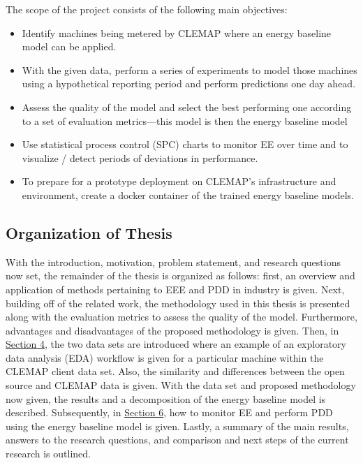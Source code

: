 The scope of the project consists of the following main objectives:

\begin{itemize}
    \item Identify machines being metered by CLEMAP where an energy baseline model can be applied.
    \item With the given data, perform a series of experiments to model those machines using a hypothetical reporting period and perform predictions one day ahead.
    \item Assess the quality of the model and select the best performing one according to a set of evaluation metrics—this model is then the energy baseline model
    \item Use statistical process control (SPC) charts to monitor EE over time and to visualize / detect periods of deviations in performance. 
    \item To prepare for a prototype deployment on CLEMAP's infrastructure and environment, create a docker container of the trained energy baseline models.
\end{itemize}

\subsection{Organization of Thesis}

With the introduction, motivation, problem statement, and research questions now set, the remainder of the thesis is organized as follows: first, an overview and application of methods pertaining to EEE and PDD in industry is given. Next, building off of the related work, the methodology used in this thesis is presented along with the evaluation metrics to assess the quality of the model. Furthermore, advantages and disadvantages of the proposed methodology is given. Then, in \hyperlink{section.4}{Section 4}, the two data sets are introduced where an example of an exploratory data analysis (EDA) workflow is given for a particular machine within the CLEMAP client data set. Also, the similarity and differences between the open source and CLEMAP data is given. With the data set and proposed methodology now given, the results and a decomposition of the energy baseline model is described. Subsequently, in \hyperlink{section.6}{Section 6}, how to monitor EE and perform PDD using the energy baseline model is given. Lastly, a summary of the main results, answers to the research questions, and comparison and next steps of the current research is outlined.